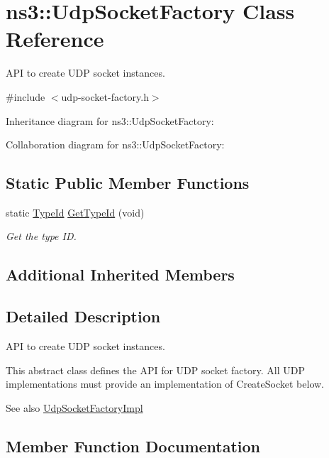 \hypertarget{classns3_1_1UdpSocketFactory}{}\section{ns3\+:\+:Udp\+Socket\+Factory Class Reference}
\label{classns3_1_1UdpSocketFactory}


A\+PI to create U\+DP socket instances.  




{\ttfamily \#include $<$udp-\/socket-\/factory.\+h$>$}



Inheritance diagram for ns3\+:\+:Udp\+Socket\+Factory\+:


Collaboration diagram for ns3\+:\+:Udp\+Socket\+Factory\+:
\subsection*{Static Public Member Functions}
\begin{DoxyCompactItemize}
\item 
static \hyperlink{classns3_1_1TypeId}{Type\+Id} \hyperlink{classns3_1_1UdpSocketFactory_ad5b47e944de8861e3dc2b6de1ccbdf5b}{Get\+Type\+Id} (void)
\begin{DoxyCompactList}\small\item\em Get the type ID. \end{DoxyCompactList}\end{DoxyCompactItemize}
\subsection*{Additional Inherited Members}


\subsection{Detailed Description}
A\+PI to create U\+DP socket instances. 

This abstract class defines the A\+PI for U\+DP socket factory. All U\+DP implementations must provide an implementation of Create\+Socket below.

\begin{DoxySeeAlso}{See also}
\hyperlink{classns3_1_1UdpSocketFactoryImpl}{Udp\+Socket\+Factory\+Impl} 
\end{DoxySeeAlso}


\subsection{Member Function Documentation}
